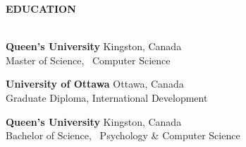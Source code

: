 \documentclass[letterpaper]{article}
\newcommand{\lineunder} {
        \vspace*{-8pt} \\
        \hspace*{-18pt} \hrulefill \\
    }
\newcommand{\header} [1] {
        \vspace{9pt}
        {\hspace*{-18pt}\vspace*{6pt} \large \textbf {#1}}
        \vspace*{-6pt} \lineunder
        \vspace{2pt}
    }
\newcommand{\employer}[4]{
        \vspace{3pt}
        \textbf{#1}  %
        \hfill #2\\  %
        \textit{#3}  %
        \hfill #4\\  %
        \vspace{1mm}
    }
\newcommand{\jobintro}[1]{
        #1
        \vspace{5pt}
    }
\newenvironment{jobtasklist}
        {
            \vspace{-12pt}
            \begin{itemize} \itemsep 0pt
        }{
            \end{itemize}
            \vspace{-3pt}
        }
\newcommand{\university}[3]{
        \textbf{#1}  %
        \hfill #2\\  %
        #3\\         %
        \vspace{2mm}
    }
\begin{document}
%
%
%
%
%
%



\header{EDUCATION}
    \university
        {Queen's University}
        {Kingston, Canada}
        {Master of Science, ~Computer Science}

    \university
        {University of Ottawa}
        {Ottawa, Canada}
        {Graduate Diploma, International Development}

    \university
        {Queen's University}
        {Kingston, Canada}
        {Bachelor of Science, ~Psychology \& Computer Science}
\end{document}
